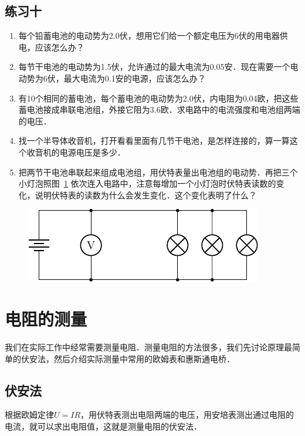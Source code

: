 \subsection*{练习十}
\begin{enumerate}
    \item 每个铅蓄电池的电动势为2.0伏，想用它们给一个额定电压为6伏的用电器供电，应该怎么办？
    \item 每节干电池的电动势为1.5伏，允许通过的最大电流为0.05安．现在需要一个电动势为6伏，最大电流为0.1安的电源，应该怎么办？
    \item 有10个相同的蓄电池，每个蓄电池的电动势为2.0伏，内电阻为0.04欧，把这些蓄电池接成串联电池组，外接它阻为3.6欧．求电路中的电流强度和电池组两端的电压．
    \item 找一个半导体收音机，打开看看里面有几节干电池，是怎样连接的，算一算这个收音机的电源电压是多少．
    \item 把两节干电池串联起来组成电池组，用伏特表量出电池组的电动势．再把三个小灯泡照图~\ref{fig_B_7-36} 依次连入电路中，注意每增加一个小灯泡时伏特表读数的变化，说明伏特表的读数为什么会发生变化．这个变化表明了什么？
\end{enumerate}

\begin{figure}[htbp]
    \centering
    \includegraphics{fig/B/7-36.pdf}
    \caption{}\label{fig_B_7-36}
\end{figure}


\section{电阻的测量}
我们在实际工作中经常需要测量电阻．测量电阻的方法很多，我们先讨论原理最简单的伏安法，然后介绍实际测量中常用的欧姆表和惠斯通电桥．

\subsection{伏安法}

根据欧姆定律$U=IR$，用伏特表测出电阻两端的电压，用安培表测出通过电阻的电流，就可以求出电阻值，这就是测量电阻的伏安法．

